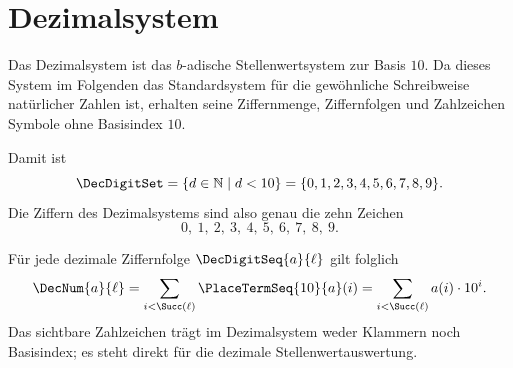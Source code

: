 \documentclass[main.tex]{subfiles}
\begin{document}
\section{Dezimalsystem}

Das Dezimalsystem ist das \(b\)-adische Stellenwertsystem zur Basis \(10\).
Da dieses System im Folgenden das Standardsystem für die gewöhnliche
Schreibweise natürlicher Zahlen ist, erhalten seine Ziffernmenge,
Ziffernfolgen und Zahlzeichen Symbole ohne Basisindex \(10\).


Damit ist
\[
  \DecDigitSet
  =
  \{d\in\mathbb{N}\mid d<10\}
  =
  \{0,1,2,3,4,5,6,7,8,9\}.
\]
Die Ziffern des Dezimalsystems sind also genau die zehn Zeichen
\[
  0,\ 1,\ 2,\ 3,\ 4,\ 5,\ 6,\ 7,\ 8,\ 9.
\]




Für jede dezimale Ziffernfolge \(\DecDigitSeq{a}{\ell}\) gilt folglich
\[
  \DecNum{a}{\ell}
  =
  \sum_{i<\Succ(\ell)} \PlaceTermSeq{10}{a}(i)
  =
  \sum_{i<\Succ(\ell)} a(i)\cdot 10^i.
\]
Das sichtbare Zahlzeichen trägt im Dezimalsystem weder Klammern noch
Basisindex; es steht direkt für die dezimale Stellenwertauswertung.
\end{document}
